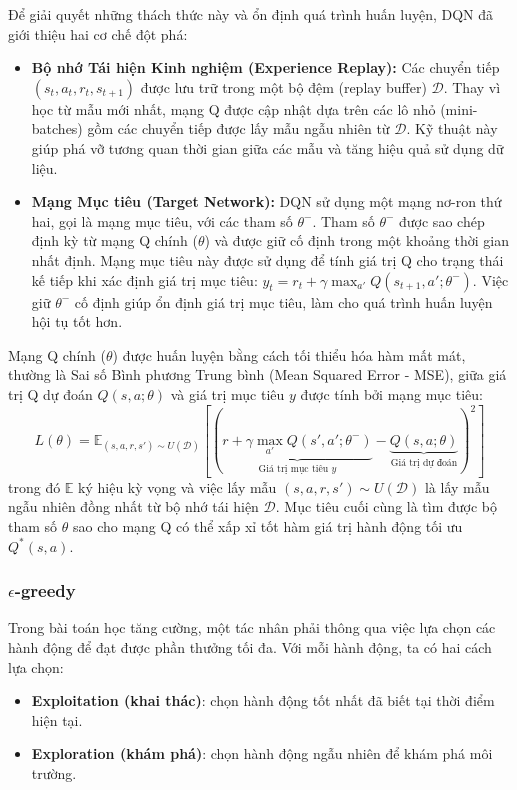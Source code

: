 Để giải quyết những thách thức này và ổn định quá trình huấn luyện, DQN đã giới thiệu hai cơ chế đột phá:
\begin{itemize}
    \item \textbf{Bộ nhớ Tái hiện Kinh nghiệm (Experience Replay):} Các chuyển tiếp $(s_t, a_t, r_t, s_{t+1})$ được lưu trữ trong một bộ đệm (replay buffer) $\mathcal{D}$. Thay vì học từ mẫu mới nhất, mạng Q được cập nhật dựa trên các lô nhỏ (mini-batches) gồm các chuyển tiếp được lấy mẫu ngẫu nhiên từ $\mathcal{D}$. Kỹ thuật này giúp phá vỡ tương quan thời gian giữa các mẫu và tăng hiệu quả sử dụng dữ liệu.
    \item \textbf{Mạng Mục tiêu (Target Network):} DQN sử dụng một mạng nơ-ron thứ hai, gọi là mạng mục tiêu, với các tham số $\theta^-$. Tham số $\theta^-$ được sao chép định kỳ từ mạng Q chính ($\theta$) và được giữ cố định trong một khoảng thời gian nhất định. Mạng mục tiêu này được sử dụng để tính giá trị Q cho trạng thái kế tiếp khi xác định giá trị mục tiêu: $y_t = r_t + \gamma \max_{a'} Q(s_{t+1}, a'; \theta^-)$. Việc giữ $\theta^-$ cố định giúp ổn định giá trị mục tiêu, làm cho quá trình huấn luyện hội tụ tốt hơn.
\end{itemize}

Mạng Q chính ($\theta$) được huấn luyện bằng cách tối thiểu hóa hàm mất mát, thường là Sai số Bình phương Trung bình (Mean Squared Error - MSE), giữa giá trị Q dự đoán $Q(s, a; \theta)$ và giá trị mục tiêu $y$ được tính bởi mạng mục tiêu:
$$ L(\theta) = \mathbb{E}_{(s, a, r, s') \sim U(\mathcal{D})} \left[ \left( \underbrace{r + \gamma \max_{a'} Q(s', a'; \theta^-)}_{\text{Giá trị mục tiêu } y} - \underbrace{Q(s, a; \theta)}_{\text{Giá trị dự đoán}} \right)^2 \right] $$
trong đó $\mathbb{E}$ ký hiệu kỳ vọng và việc lấy mẫu $(s, a, r, s') \sim U(\mathcal{D})$ là lấy mẫu ngẫu nhiên đồng nhất từ bộ nhớ tái hiện $\mathcal{D}$. Mục tiêu cuối cùng là tìm được bộ tham số $\theta$ sao cho mạng Q có thể xấp xỉ tốt hàm giá trị hành động tối ưu $Q^*(s, a)$.


\subsubsection{$\epsilon$-greedy}

Trong bài toán học tăng cường, một tác nhân phải thông qua việc lựa chọn các hành động để đạt được phần thưởng tối đa. Với mỗi hành động, ta có hai cách lựa chọn:

\begin{itemize}
    \item \textbf{Exploitation (khai thác)}: chọn hành động tốt nhất đã biết tại thời điểm hiện tại.
    \item \textbf{Exploration (khám phá)}: chọn hành động ngẫu nhiên để khám phá môi trường.
\end{itemize}

